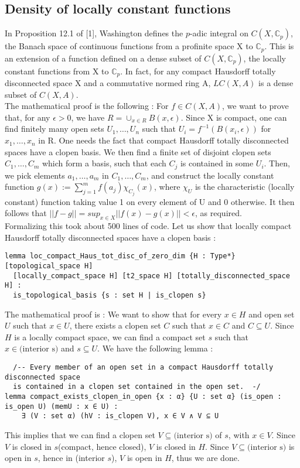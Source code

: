 \documentclass[11pt]{article}
\begin{document}
\subsection{Density of locally constant functions}
In Proposition 12.1 of [1], Washington defines the $p$-adic integral on $C(X, \mathbb{C}_p)$,
the Banach space of continuous functions from a profinite space X to $\mathbb{C}_p$.
This is an extension of a function defined on a dense subset of $C(X, \mathbb{C}_p)$, the
locally constant functions from X to $\mathbb{C}_p$. In fact, for any compact
Hausdorff totally disconnected space X and a commutative
normed ring A, $LC(X, A)$ is a dense subset of $C(X, A)$. \\

The mathematical proof is the following : For $f \in C(X, A)$, we want to prove that,
for any $\epsilon > 0$, we have $R = \cup_{x \in R} B(x, \epsilon)$. Since X is compact,
one can find finitely many open sets $U_1, \dots, U_n$ such that $U_i = f^{-1}(B(x_i, \epsilon))$
for $x_1, \dots, x_n$ in R. One needs the fact that compact Hausdorff totally disconnected spaces
have a clopen basis. We then find a finite set of disjoint clopen sets $C_1, \dots, C_m$ which form
a basis, such that each $C_j$ is contained in some $U_i$.
Then, we pick elements $a_1, \dots, a_m$ in $C_1, \dots, C_m$, and construct the locally constant
function $g(x) := \sum_{j = 1}^m f(a_j) \chi_{C_j}(x)$, where $\chi_U$ is the characteristic
(locally constant) function taking value 1 on every element of U and 0 otherwise. It then follows
that $|| f - g || = sup_{x \in X} ||f(x) - g(x)|| < \epsilon$, as required. \\

Formalizing this took about 500 lines of code. Let us show that locally compact Hausdorff
totally disconnected spaces have a clopen basis :

\begin{lstlisting}
lemma loc_compact_Haus_tot_disc_of_zero_dim {H : Type*} [topological_space H]
  [locally_compact_space H] [t2_space H] [totally_disconnected_space H] :
  is_topological_basis {s : set H | is_clopen s}
\end{lstlisting}

The mathematical proof is : We want to show that for every $x \in H$ and open set $U$ such that
$x \in U$, there exists a clopen set $C$ such that $x \in C$ and $C \subseteq U$. Since $H$ is a
locally compact space, we can find a compact set $s$ such that $x \in \text{(interior s)}$ and
$s \subseteq U$. We have the following lemma :
\begin{lstlisting}
  /-- Every member of an open set in a compact Hausdorff totally disconnected space
  is contained in a clopen set contained in the open set.  -/
lemma compact_exists_clopen_in_open {x : α} {U : set α} (is_open : is_open U) (memU : x ∈ U) :
    ∃ (V : set α) (hV : is_clopen V), x ∈ V ∧ V ⊆ U
\end{lstlisting}
This implies that we can find a clopen set $V \subseteq \text{(interior s)}$ of $s$, with $x \in V$.
 Since $V$ is closed in $s$(compact, hence closed), $V$ is closed in $H$. Since
$V \subseteq \text{(interior s)}$ is open in $s$, hence in (interior $s$), $V$ is open in $H$, thus
we are done. \\
\end{document}
